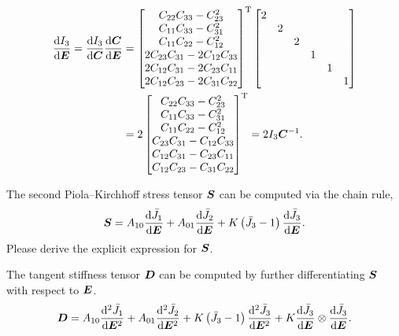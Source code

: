 \begin{gather}
\begin{split}
\dfrac{\mathrm{d}I_3}{\mathrm{d}\bm{E}}=\dfrac{\mathrm{d}I_3}{\mathrm{d}\bm{C}}\dfrac{\mathrm{d}\bm{C}}{\mathrm{d}\bm{E}}&=\begin{bmatrix}
    C_{22}C_{33}-C_{23}^2       \\
    C_{11}C_{33}-C_{31}^2       \\
    C_{11}C_{22}-C_{12}^2       \\
    2C_{23}C_{31}-2C_{12}C_{33} \\
    2C_{12}C_{31}-2C_{23}C_{11} \\
    2C_{12}C_{23}-2C_{31}C_{22}
\end{bmatrix}^{\mathrm{T}}
\begin{bmatrix}
    2 &   &   &   &   &   \\
      & 2 &   &   &   &   \\
      &   & 2 &   &   &   \\
      &   &   & 1 &   &   \\
      &   &   &   & 1 &   \\
      &   &   &   &   & 1
\end{bmatrix}\\
&=2\begin{bmatrix}
    C_{22}C_{33}-C_{23}^2     \\
    C_{11}C_{33}-C_{31}^2     \\
    C_{11}C_{22}-C_{12}^2     \\
    C_{23}C_{31}-C_{12}C_{33} \\
    C_{12}C_{31}-C_{23}C_{11} \\
    C_{12}C_{23}-C_{31}C_{22}
\end{bmatrix}^{\mathrm{T}}=2I_3\bm{C}^{-1}.
\end{split}
\end{gather}

The second Piola--Kirchhoff stress tensor $\bm{S}$ can be computed via the chain rule,
\begin{gather}
    \bm{S}=A_{10}\dfrac{\mathrm{d}\bar{J_1}}{\mathrm{d}\bm{E}}+A_{01}\dfrac{\mathrm{d}\bar{J_2}}{\mathrm{d}\bm{E}}+K\left(\bar{J_3}-1\right)\dfrac{\mathrm{d}\bar{J_3}}{\mathrm{d}\bm{E}}.
\end{gather}
Please derive the explicit expression for $\bm{S}$.

The tangent stiffness tensor $\bm{D}$ can be computed by further differentiating $\bm{S}$ with respect to $\bm{E}$.
\begin{gather}
    \bm{D}=A_{10}\dfrac{\mathrm{d}^2\bar{J_1}}{\mathrm{d}\bm{E}^2}+A_{01}\dfrac{\mathrm{d}^2\bar{J_2}}{\mathrm{d}\bm{E}^2}+K\left(\bar{J_3}-1\right)\dfrac{\mathrm{d}^2\bar{J_3}}{\mathrm{d}\bm{E}^2}+K\dfrac{\mathrm{d}\bar{J_3}}{\mathrm{d}\bm{E}}\otimes\dfrac{\mathrm{d}\bar{J_3}}{\mathrm{d}\bm{E}}.
\end{gather}

